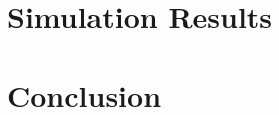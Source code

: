 \documentclass[letterpaper,journal]{IEEEtran}
\begin{document}
	\section{Simulation Results}
	\label{sec:simulation}
	
	\section{Conclusion}
	\label{sec:conclusion}
	
	
	
	
\end{document}
